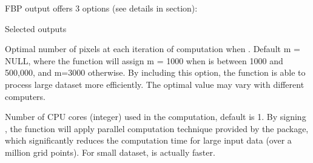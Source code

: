 \documentclass[a4paper]{book}
\begin{document}
\begin{Arguments}
\begin{ldescription}
\item[\code{output}] FBP output offers 3 options (see details in 
section):



\item[\code{select}] Selected outputs

\item[\code{m}] Optimal number of pixels at each iteration of computation when
. Default m = NULL, where the function will
assign m = 1000 when  is between 1000 and 500,000, and
m=3000 otherwise. By including this option, the function is able to process
large dataset more efficiently. The optimal value may vary with different
computers.

\item[\code{cores}] Number of CPU cores (integer) used in the computation, default
is 1.  By signing , the function will apply parallel
computation technique provided by the  package, which
significantly reduces the computation time for large input data (over a
million grid points). For small dataset,  is actually faster.
\end{ldescription}
\end{Arguments}
%
\end{document}
